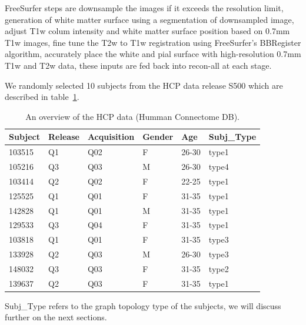 \documentclass{article}
\begin{document}
{FreeSurfer steps are downsample the images if it exceeds the resolution limit, 
generation of white matter surface using a segmentation of downsampled image, 
adjust T1w colum intensity and white matter surface position based on 0.7mm 
T1w images, fine tune the T2w to T1w registration using FreeSurfer's BBRegister 
algorithm, accurately place the white and pial surface with high-resolution 0.7mm 
T1w and T2w data, these inputs are fed back into recon-all at each stage. 

We randomly selected 10 subjects from the HCP data release S500 which 
are described in table~\ref{table:data}.

\begin{table}[H]\hspace*{-1cm}
\centering
\begin{threeparttable}
\caption{An overview of the HCP data (Humman Connectome DB).}

\begin{tabular}{@{}llllll@{}}
\toprule
Subject & Release & Acquisition & Gender & Age      & Subj\_Type   \\ \midrule
103515  & Q1      & Q02         & F      & 26-30    & type1         \\
105216  & Q3      & Q03         & M      & 26-30    & type4         \\
103414  & Q2      & Q02         & F      & 22-25    & type1         \\
125525  & Q1      & Q01         & F      & 31-35    & type1         \\
142828  & Q1      & Q01         & M      & 31-35    & type1         \\
129533  & Q3      & Q04         & F      & 31-35    & type1         \\
103818  & Q1      & Q01         & F      & 31-35    & type3         \\
133928  & Q2      & Q03         & M      & 26-30    & type3         \\
148032  & Q3      & Q03         & F      & 31-35    & type2         \\
139637  & Q2      & Q03         & F      & 31-35    & type1         \\ \bottomrule
\end{tabular}
\begin{tablenotes}
      \small
      \item *Subj\_Type refers to the graph topology type of the subjects,
      we will discuss further on the next sections.
\end{tablenotes}
\end{threeparttable}
\label{table:data}
\end{table}


}
\end{document}
